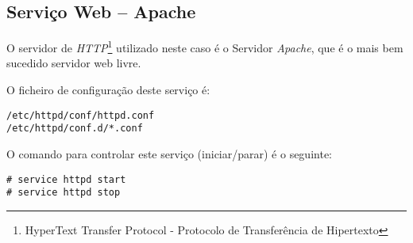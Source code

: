 \subsection{Serviço Web -- Apache}

O servidor de \emph{HTTP}\footnote{HyperText Transfer Protocol - Protocolo de Transferência de Hipertexto} utilizado neste caso é o Servidor \emph{Apache}, que é o mais bem sucedido servidor web livre.

O ficheiro de configuração deste serviço é:

\begin{Verbatim}[commandchars=\\\{\}]
/etc/httpd/conf/httpd.conf
/etc/httpd/conf.d/*.conf
\end{Verbatim}

O comando para controlar este serviço (iniciar/parar) é o seguinte:

\begin{Verbatim}[commandchars=\\\{\}]
# service httpd start
# service httpd stop
\end{Verbatim}

